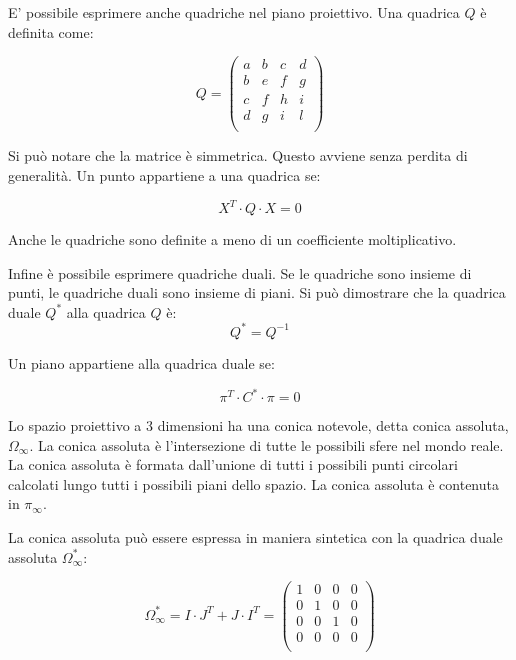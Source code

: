 E' possibile esprimere anche quadriche nel piano proiettivo. Una quadrica $Q$ è definita come:

\begin{equation*}
 Q = \begin{pmatrix} a & b & c & d \\ b & e & f & g \\ c & f & h & i \\ d & g & i & l \\ \end{pmatrix}
\end{equation*}

Si può notare che la matrice è simmetrica. Questo avviene senza perdita di generalità.
Un punto appartiene a una quadrica se:

\begin{equation*}
 X^T\cdot Q \cdot X = 0
\end{equation*}

Anche le quadriche sono definite a meno di un coefficiente moltiplicativo.

Infine è possibile esprimere quadriche duali. Se le quadriche sono insieme di punti, le quadriche duali sono insieme di piani.
Si può dimostrare che la quadrica duale $Q^*$ alla quadrica $Q$ è:
\begin{equation*}
 Q^*=Q^{-1}
\end{equation*}

Un piano appartiene alla quadrica duale se:

\begin{equation*}
 \pi^T\cdot C^* \cdot \pi = 0
\end{equation*}

Lo spazio proiettivo a 3 dimensioni ha una conica notevole, detta conica assoluta, $\Omega_\infty$. La conica assoluta è l'intersezione di tutte le possibili sfere nel mondo reale. La conica assoluta è formata dall'unione di tutti i possibili punti circolari calcolati lungo tutti i possibili piani dello spazio.
La conica assoluta è contenuta in $\pi_\infty$.

La conica assoluta può essere espressa in maniera sintetica con la quadrica duale assoluta $\Omega^*_\infty$:

\begin{equation*}
 \Omega^*_\infty = I\cdot J^T + J\cdot I^T =\begin{pmatrix} 1 & 0 & 0 & 0 \\ 0 & 1 & 0 & 0 \\ 0 & 0 & 1 & 0 \\ 0 & 0 & 0 & 0 \\ \end{pmatrix}
\end{equation*}

